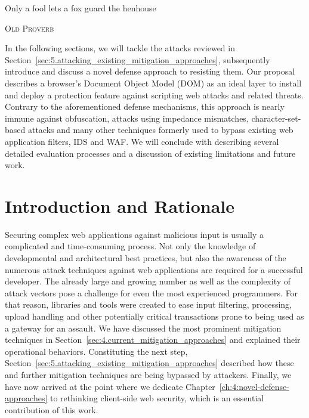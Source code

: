 \epigraph{Only a fool lets a fox guard the henhouse}%
{\textsc{Old Proverb}}

\label{sec:6.rethinking_client_side_web_security}

  In the following sections, we will tackle the attacks reviewed in Section~\ref{sec:5.attacking_existing_mitigation_approaches}, subsequently introduce and discuss a novel defense approach to resisting them. Our proposal describes a browser's Document Object Model (DOM) as an ideal layer to install and deploy a protection feature against scripting web attacks and related threats. Contrary to the aforementioned defense mechanisms, this approach is nearly immune against obfuscation, attacks using impedance mismatches, character-set-based attacks and many other techniques formerly used to bypass existing web application filters, IDS and WAF. We will conclude with describing several detailed evaluation processes and a discussion of existing limitations and future work.

  \section{Introduction and Rationale}
  \label{subsec:6.1.introduction_and_rationale}

  Securing complex web applications against malicious input is usually a complicated and time-consuming process. Not only the knowledge of developmental and architectural best practices, but also the awareness of the numerous attack techniques against web applications are required for a successful developer. The already large and growing number as well as the complexity of attack vectors pose a challenge for even the most experienced programmers. For that reason, libraries and tools were created to ease input filtering, processing, upload handling and other potentially critical transactions prone to being used as a gateway for an assault. We have discussed the most prominent mitigation techniques in Section~\ref{sec:4.current_mitigation_approaches} and explained their operational behaviors. Constituting the next step,  Section~\ref{sec:5.attacking_existing_mitigation_approaches} described how these and further mitigation techniques are being bypassed by attackers. Finally, we have now arrived at the point where we dedicate Chapter~\ref{ch:4:novel-defense-approaches} to rethinking client-side web security, which is an essential contribution of this work.\\

